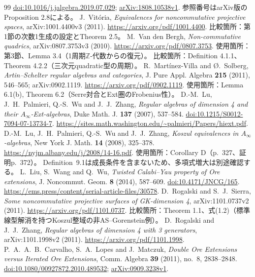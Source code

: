\documentclass[11pt,a4paper]{ltjsarticle}
\theoremstyle{definition}
\begin{document}
\begin{thebibliography}{99}
\href{https://doi.org/10.1016/j.jalgebra.2019.07.029}{doi:10.1016/j.jalgebra.2019.07.029};
\href{https://arxiv.org/abs/1808.10538v1}{arXiv:1808.10538v1}.
参照番号はarXiv版のProposition 2.8による。
J.~Vit\'oria, \emph{Equivalences for noncommutative projective spaces},
arXiv:1001.4400v3 (2011).
\url{https://arxiv.org/pdf/1001.4400}.
比較箇所：第1節の次数1生成の設定とTheorem 2.5。
M.~Van den Bergh, \emph{Non-commutative quadrics},
arXiv:0807.3753v3 (2010).
\url{https://arxiv.org/pdf/0807.3753}.
使用箇所：第3節、Lemma 3.4（1周期$\mathbb Z$-代数からの復元）。
比較箇所：Definition 4.1.1、Theorem 4.2.2（三次元quadratic型の周期）。
R.~Mart\'inez-Villa and {\O}.~Solberg,
\emph{Artin--Schelter regular algebras and categories},
J. Pure Appl. Algebra \textbf{215} (2011), 546--565;
arXiv:0902.1119.
\url{https://arxiv.org/pdf/0902.1119}.
使用箇所：Lemma 6.1(b), Theorem 6.2（Serre対合とExt圏のFrobenius性）。
D.-M.~Lu, J.~H.~Palmieri, Q.-S.~Wu and J.~J.~Zhang,
\emph{Regular algebras of dimension 4 and their $A_\infty$-Ext-algebras},
Duke Math. J. \textbf{137} (2007), 537--584.
\href{https://doi.org/10.1215/S0012-7094-07-13734-7}{doi:10.1215/S0012-7094-07-13734-7}.
\url{https://sites.math.washington.edu/~palmieri/Papers/hiext.pdf}.
D.-M.~Lu, J.~H.~Palmieri, Q.-S.~Wu and J.~J.~Zhang,
\emph{Koszul equivalences in $A_\infty$-algebras},
New York J. Math. \textbf{14} (2008), 325--378.
\url{https://nyjm.albany.edu/j/2008/14-16.pdf}.
使用箇所：Corollary D（p.~327、証明p.~372）。
Definition~9.1は成長条件を含まないため、多項式増大は別途確認する。
L.~Liu, S.~Wang and Q.~Wu,
\emph{Twisted Calabi--Yau property of Ore extensions},
J. Noncommut. Geom. \textbf{8} (2014), 587--609.
\href{https://doi.org/10.4171/JNCG/165}{doi:10.4171/JNCG/165}.
\url{https://ems.press/content/serial-article-files/30578}.
D.~Rogalski and S.~J.~Sierra,
\emph{Some noncommutative projective surfaces of GK-dimension 4},
arXiv:1101.0737v2 (2011).
\url{https://arxiv.org/pdf/1101.0737}.
比較箇所：Theorem 1.1、式(1.2)（標準線型解消を持つKoszul整域の非AS--Gorenstein例）。
D.~Rogalski and J.~J.~Zhang,
\emph{Regular algebras of dimension 4 with 3 generators},
arXiv:1101.1998v2 (2011).
\url{https://arxiv.org/pdf/1101.1998}.
P.~A.~A.~B.~Carvalho, S.~A.~Lopes and J.~Matczuk,
\emph{Double Ore Extensions versus Iterated Ore Extensions},
Comm. Algebra \textbf{39} (2011), no.~8, 2838--2848.
\href{https://doi.org/10.1080/00927872.2010.489532}{doi:10.1080/00927872.2010.489532};
\href{https://arxiv.org/abs/0909.3238v1}{arXiv:0909.3238v1}.

\end{thebibliography}
\end{document}
